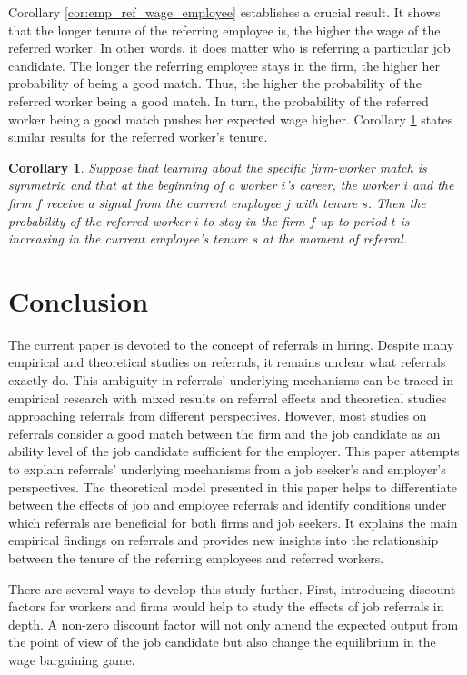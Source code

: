 \documentclass[12pt]{article}
\newtheorem{corollary}[theorem]{Corollary}
\begin{document}
Corollary \ref{cor:emp_ref_wage_employee} establishes a crucial result. It shows that the longer tenure of the referring employee is, the higher the wage of the referred worker. In other words, it does matter who is referring a particular job candidate. The longer the referring employee stays in the firm, the higher her probability of being a good match. Thus, the higher the probability of the referred worker being a good match. In turn, the probability of the referred worker being a good match pushes her expected wage higher. Corollary \ref{cor:emp_ref_tenure_referee} states similar results for the referred worker's tenure. 

\begin{corollary}\label{cor:emp_ref_tenure_referee}
Suppose that learning about the specific firm-worker match is symmetric and that at the beginning of a worker $i$'s career, the worker $i$ and the firm $f$ receive a signal from the current employee $j$ with tenure $s$. Then the probability of the referred worker $i$ to stay in the firm $f$ up to period $t$ is increasing in the current employee's tenure $s$ at the moment of referral.
\end{corollary}

\section{Conclusion} \label{sec:conclusion}

The current paper is devoted to the concept of referrals in hiring. Despite many empirical and theoretical studies on referrals, it remains unclear what referrals exactly do. This ambiguity in referrals' underlying mechanisms can be traced in empirical research with mixed results on referral effects and theoretical studies approaching referrals from different perspectives. However, most studies on referrals consider a good match between the firm and the job candidate as an ability level of the job candidate sufficient for the employer. This paper attempts to explain referrals' underlying mechanisms from a job seeker's and employer's perspectives. The theoretical model presented in this paper helps to differentiate between the effects of job and employee referrals and identify conditions under which referrals are beneficial for both firms and job seekers. It explains the main empirical findings on referrals and provides new insights into the relationship between the tenure of the referring employees and referred workers. 

There are several ways to develop this study further. First, introducing discount factors for workers and firms would help to study the effects of job referrals in depth. A non-zero discount factor will not only amend the expected output from the point of view of the job candidate but also change the equilibrium in the wage bargaining game.
\end{document}
